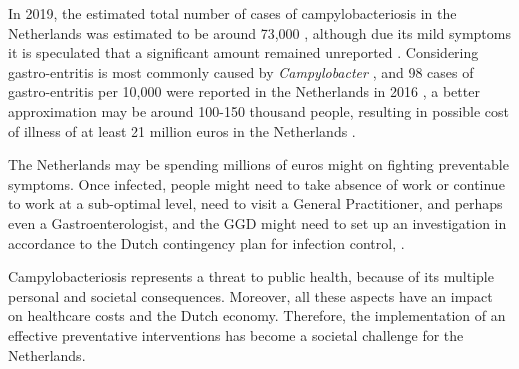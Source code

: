 In 2019, the estimated total number of cases of campylobacteriosis in the Netherlands was estimated to be around 73,000 \parencite{lagerweij_disease_2020}, although due its mild symptoms it is speculated that a significant amount remained unreported \parencite{koutsoumanis_update_2020}. Considering gastro-entritis is most commonly caused by \textit{Campylobacter} \parencite{fouts_major_2005}, and 98 cases of gastro-entritis per 10,000 were reported in the Netherlands in 2016 \parencite{van_pelt_jaarraport_2016}, a better approximation may be around 100-150 thousand people, resulting in possible cost of illness of at least 21 million euros in the Netherlands \parencite{havelaar_costs_2005}.

The Netherlands may be spending millions of euros might on fighting preventable symptoms. Once infected, people might need to take absence of work or continue to work at a sub-optimal level, need to visit a General Practitioner, and perhaps even a Gastroenterologist, and the GGD might need to set up an investigation in accordance to the Dutch contingency plan for infection control, . 

Campylobacteriosis represents a threat to public health, because of its multiple personal and societal consequences. Moreover, all these aspects have an impact on healthcare costs and the Dutch economy. Therefore, the implementation of an effective preventative interventions has become a societal challenge for the Netherlands.




